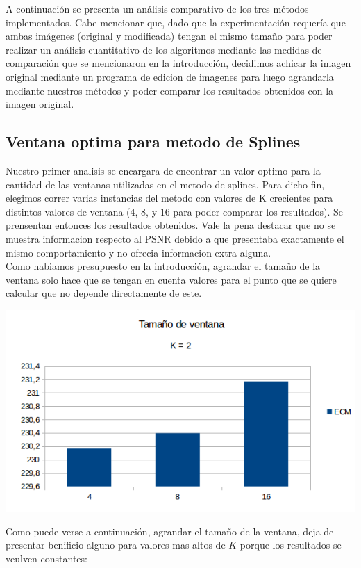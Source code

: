 A continuación se presenta un análisis comparativo de los tres métodos implementados.
Cabe mencionar que, dado que la experimentación requería que ambas imágenes (original y modificada) tengan el mismo tamaño para poder realizar un análisis cuantitativo de los algoritmos mediante las medidas de comparación que se mencionaron en la introducción, decidimos achicar la imagen original mediante un programa de edicion de imagenes para luego agrandarla mediante nuestros métodos y poder comparar los resultados obtenidos con la imagen original.

\subsection{Ventana optima para metodo de Splines}
Nuestro primer analisis se encargara de encontrar un valor optimo para la cantidad de las ventanas utilizadas en el metodo de splines.
Para dicho fin, elegimos correr varias instancias del metodo con valores de K crecientes para distintos valores de ventana (4, 8, y 16 para poder comparar los resultados). Se prensentan entonces los resultados obtenidos. Vale la pena destacar que no se muestra informacion respecto al PSNR debido a que presentaba exactamente el mismo comportamiento y no ofrecia informacion extra alguna.
\\
Como habiamos presupuesto en la introducción, agrandar el tamaño de la ventana solo hace que se tengan en cuenta valores para el punto que se quiere calcular que no depende directamente de este. 

\begin{center}
\includegraphics[scale=0.50]{imagenes/VK2.png}
\end{center}

Como puede verse a continuación, agrandar el tamaño de la ventana, deja de presentar benificio alguno para valores mas altos de $K$ porque los resultados se veulven constantes:

